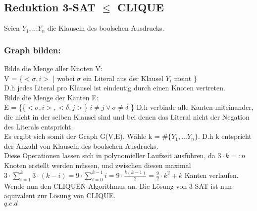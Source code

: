 \documentclass[a4paper,11pt,twoside]{article}
\begin{document}
\subsection*{Reduktion 3-SAT $\le$ CLIQUE}
Seien $Y_1, ... Y_n$ die Klauseln des boolschen Ausdrucks.

\subsubsection*{Graph bilden:}
Bilde die Menge aller Knoten V:\\
V = \{$<\sigma, i>$ | wobei $\sigma$ ein Literal aus der Klausel $Y_i$ meint \}\\
D.h jedes Literal pro Klausel ist eindeutig durch einen Knoten vertreten.\\

Bilde die Menge der Kanten E:\\
E = \{\{$<\sigma, i>, <\delta, j>$\} $i \not= j \lor \sigma \not= \delta$ \}
D.h verbinde alle Kanten miteinander, die nicht in der selben Klausel sind und bei denen das Literal nicht der Negation des Literals entspricht.\\

Es ergibt sich somit der Graph G(V,E). Wähle k = $\#\{Y_1, ... Y_n\}$. D.h k entspricht der Anzahl von Klauseln des boolschen Ausdrucks.\\
Diese Operationen lassen sich in polynomieller Laufzeit ausführen, da $3\cdot k =: n$ Knoten erstellt werden müssen, und zwischen diesen maximal $3\cdot\sum_{i=1}^{k}3\cdot(k-i)=9\cdot\sum_{i=0}^{k-1} i = 9\cdot\frac{k(k-1)}{2}=\frac{9}{2}\cdot k^2+k$ Kanten verlaufen.\\

Wende nun den CLIQUEN-Algorithmus an. Die Lösung von 3-SAT ist nun äquivalent zur Lösung von CLIQUE.\\

$q.e.d$
\end{document}
